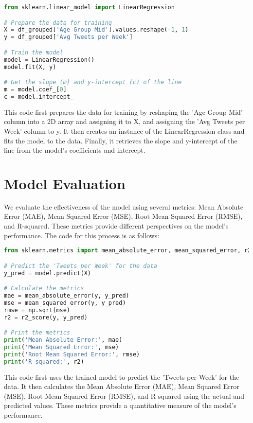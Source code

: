 \documentclass{article}
\begin{document}
\begin{lstlisting}[language=Python]
from sklearn.linear_model import LinearRegression

# Prepare the data for training
X = df_grouped['Age Group Mid'].values.reshape(-1, 1)
y = df_grouped['Avg Tweets per Week']

# Train the model
model = LinearRegression()
model.fit(X, y)

# Get the slope (m) and y-intercept (c) of the line
m = model.coef_[0]
c = model.intercept_
\end{lstlisting}

This code first prepares the data for training by reshaping the 'Age Group Mid' column into a 2D array and assigning it to X, and assigning the 'Avg Tweets per Week' column to y. It then creates an instance of the LinearRegression class and fits the model to the data. Finally, it retrieves the slope and y-intercept of the line from the model's coefficients and intercept.

\section{Model Evaluation}

We evaluate the effectiveness of the model using several metrics: Mean Absolute Error (MAE), Mean Squared Error (MSE), Root Mean Squared Error (RMSE), and R-squared. These metrics provide different perspectives on the model's performance. The code for this process is as follows:

\begin{lstlisting}[language=Python]
from sklearn.metrics import mean_absolute_error, mean_squared_error, r2_score

# Predict the 'Tweets per Week' for the data
y_pred = model.predict(X)

# Calculate the metrics
mae = mean_absolute_error(y, y_pred)
mse = mean_squared_error(y, y_pred)
rmse = np.sqrt(mse)
r2 = r2_score(y, y_pred)

# Print the metrics
print('Mean Absolute Error:', mae)
print('Mean Squared Error:', mse)
print('Root Mean Squared Error:', rmse)
print('R-squared:', r2)
\end{lstlisting}

This code first uses the trained model to predict the 'Tweets per Week' for the data. It then calculates the Mean Absolute Error (MAE), Mean Squared Error (MSE), Root Mean Squared Error (RMSE), and R-squared using the actual and predicted values. These metrics provide a quantitative measure of the model's performance.
\end{document}
